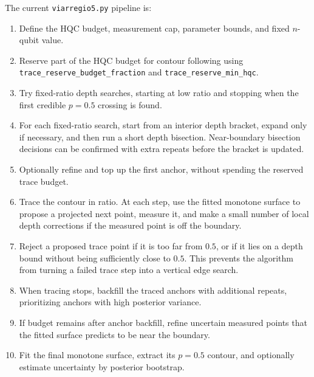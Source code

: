The current \texttt{viarregio5.py} pipeline is:

\begin{enumerate}
    \item Define the HQC budget, measurement cap, parameter bounds, and fixed
    \(n\)-qubit value.

    \item Reserve part of the HQC budget for contour following using
    \texttt{trace\_reserve\_budget\_fraction} and
    \texttt{trace\_reserve\_min\_hqc}.

    \item Try fixed-ratio depth searches, starting at low ratio and stopping
    when the first credible \(p=0.5\) crossing is found.

    \item For each fixed-ratio search, start from an interior depth bracket,
    expand only if necessary, and then run a short depth bisection.  Near-boundary
    bisection decisions can be confirmed with extra repeats before the bracket
    is updated.

    \item Optionally refine and top up the first anchor, without spending the
    reserved trace budget.

    \item Trace the contour in ratio.  At each step, use the fitted monotone
    surface to propose a projected next point, measure it, and make a small
    number of local depth corrections if the measured point is off the boundary.

    \item Reject a proposed trace point if it is too far from \(0.5\), or if it
    lies on a depth bound without being sufficiently close to \(0.5\).  This
    prevents the algorithm from turning a failed trace step into a vertical
    edge search.

    \item When tracing stops, backfill the traced anchors with additional
    repeats, prioritizing anchors with high posterior variance.

    \item If budget remains after anchor backfill, refine uncertain measured
    points that the fitted surface predicts to be near the boundary.

    \item Fit the final monotone surface, extract its \(p=0.5\) contour, and
    optionally estimate uncertainty by posterior bootstrap.
\end{enumerate}


